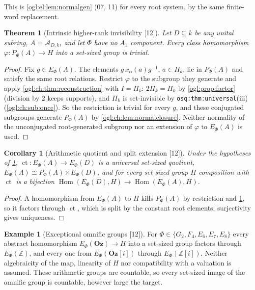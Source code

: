 \documentclass[11pt,oneside]{article}
\numberwithin{equation}{section}
\newtheorem{theorem}{Theorem}[section]
\newtheorem{corollary}[corollary]{Corollary}
\theoremstyle{definition}
\newtheorem{example}[example]{Example}
\theoremstyle{remark}
\newcommand{\Oz}{\mathbf{Oz}}
\newcommand{\GOz}{\mathbf{Oz}[i]}
\newcommand{\Z}{\mathbb Z}
\newcommand{\A}{\mathcal A}
\newcommand{\ct}{\operatorname{ct}}
\newcommand{\Hom}{\operatorname{Hom}}
\newcommand{\src}[1]{\textup{\textsf{\small[#1]}}}
\newcommand{\replabel}[1]{\nolinkurl{#1}}
\begin{document}
This is \cref{ogl:el:lem:normalgen} (07, 11) for every root system, by the same
finite-word replacement.

\begin{theorem}[Intrinsic higher-rank invisibility \src{12}]\label{ogl:ch:thm:intrinsic}
Let $D\subseteq k$ be any unital subring, $A=\A_{D,k}$, and let $\Phi$ have no
$A_1$ component. Every class homomorphism $\varphi:P_\Phi(A)\to H$ into a
set-sized group is trivial.
\end{theorem}
\begin{proof}
Fix $g\in E_\Phi(A)$. The elements $g\,x_\alpha(a)g^{-1}$, $a\in\Pi_k$, lie in
$P_\Phi(A)$ and satisfy the same root relations. Restrict $\varphi$ to the
subgroup they generate and apply \cref{ogl:ch:thm:reconstruction} with
$I=\Pi_k$: $2\Pi_k=\Pi_k$ by \cref{ogl:prop:factor} (division by $2$ keeps
supports), and $\Pi_k$ is set-invisible by \replabel{osq:thm:universal}(iii)
(\cref{ogl:ch:sub:once}). So the restriction is trivial for every $g$, and these
conjugated subgroups generate $P_\Phi(A)$ by \cref{ogl:ch:lem:normalclosure}.
Neither normality of the unconjugated root-generated subgroup nor an extension
of $\varphi$ to $E_\Phi(A)$ is used.
\end{proof}

\begin{corollary}[Arithmetic quotient and split extension \src{12}]\label{ogl:ch:cor:universal}
Under the hypotheses of \cref{ogl:ch:thm:intrinsic}, $\ct:E_\Phi(A)\to E_\Phi(D)$
is a universal set-sized quotient, $E_\Phi(A)\cong P_\Phi(A)\rtimes E_\Phi(D)$,
and for every set-sized group $H$ composition with $\ct$ is a bijection
$\Hom(E_\Phi(D),H)\to\Hom(E_\Phi(A),H)$.
\end{corollary}
\begin{proof}
A homomorphism from $E_\Phi(A)$ to $H$ kills $P_\Phi(A)$ by restriction and
\cref{ogl:ch:thm:intrinsic}, so it factors through $\ct$, which is split by
the constant root elements; surjectivity gives uniqueness.
\end{proof}

\begin{example}[Exceptional omnific groups \src{12}]\label{ogl:ch:ex:exceptional}
For $\Phi\in\{G_2,F_4,E_6,E_7,E_8\}$ every abstract homomorphism
$E_\Phi(\Oz)\to H$ into a set-sized group factors through $E_\Phi(\Z)$, and every
one from $E_\Phi(\GOz)$ through $E_\Phi(\Z[i])$. Neither algebraicity of the
map, linearity of $H$ nor compatibility with a valuation is assumed. These
arithmetic groups are countable, so every set-sized image of the omnific group
is countable, however large the target.
\end{example}
\end{document}
